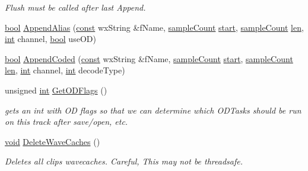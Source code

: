 \begin{DoxyCompactItemize}
\begin{DoxyCompactList}\small\item\em Flush must be called after last Append. \end{DoxyCompactList}\item 
\hyperlink{mac_2config_2i386_2lib-src_2libsoxr_2soxr-config_8h_abb452686968e48b67397da5f97445f5b}{bool} \hyperlink{class_wave_track_a1be99bf9423f1cd5bf86ffdb4320d1cf}{Append\+Alias} (\hyperlink{getopt1_8c_a2c212835823e3c54a8ab6d95c652660e}{const} wx\+String \&f\+Name, \hyperlink{include_2audacity_2_types_8h_afa427e1f521ea5ec12d054e8bd4d0f71}{sample\+Count} \hyperlink{seqread_8c_ac503262ae470564980711da4f78b1181}{start}, \hyperlink{include_2audacity_2_types_8h_afa427e1f521ea5ec12d054e8bd4d0f71}{sample\+Count} \hyperlink{lib_2expat_8h_af86d325fecfc8f47b61fbf5a5146f582}{len}, \hyperlink{xmltok_8h_a5a0d4a5641ce434f1d23533f2b2e6653}{int} channel, \hyperlink{mac_2config_2i386_2lib-src_2libsoxr_2soxr-config_8h_abb452686968e48b67397da5f97445f5b}{bool} use\+OD)
\item 
\hyperlink{mac_2config_2i386_2lib-src_2libsoxr_2soxr-config_8h_abb452686968e48b67397da5f97445f5b}{bool} \hyperlink{class_wave_track_a56c95e5c6b671b69de16590932fb0b76}{Append\+Coded} (\hyperlink{getopt1_8c_a2c212835823e3c54a8ab6d95c652660e}{const} wx\+String \&f\+Name, \hyperlink{include_2audacity_2_types_8h_afa427e1f521ea5ec12d054e8bd4d0f71}{sample\+Count} \hyperlink{seqread_8c_ac503262ae470564980711da4f78b1181}{start}, \hyperlink{include_2audacity_2_types_8h_afa427e1f521ea5ec12d054e8bd4d0f71}{sample\+Count} \hyperlink{lib_2expat_8h_af86d325fecfc8f47b61fbf5a5146f582}{len}, \hyperlink{xmltok_8h_a5a0d4a5641ce434f1d23533f2b2e6653}{int} channel, \hyperlink{xmltok_8h_a5a0d4a5641ce434f1d23533f2b2e6653}{int} decode\+Type)
\item 
unsigned \hyperlink{xmltok_8h_a5a0d4a5641ce434f1d23533f2b2e6653}{int} \hyperlink{class_wave_track_a56ce9eef3a87624a428a0c44058a8484}{Get\+O\+D\+Flags} ()
\begin{DoxyCompactList}\small\item\em gets an int with OD flags so that we can determine which O\+D\+Tasks should be run on this track after save/open, etc. \end{DoxyCompactList}\item 
\hyperlink{sound_8c_ae35f5844602719cf66324f4de2a658b3}{void} \hyperlink{class_wave_track_ac2e0fb56a6fd859520ed3f89eba9718b}{Delete\+Wave\+Caches} ()
\begin{DoxyCompactList}\small\item\em Deletes all clips\textquotesingle{} wavecaches. Careful, This may not be threadsafe. \end{DoxyCompactList}\item 

\end{DoxyCompactItemize}
